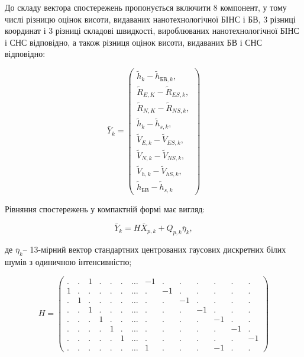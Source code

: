 До складу вектора спостережень  пропонується включити 8 компонент, у тому числі різницю 
оцінок висоти, видаваних  нанотехнологічної БІНС   і БВ, 3 різниці координат і 3 
різниці складові швидкості, вироблюваних нанотехнологічної БІНС і СНС відповідно, 
а також різниця оцінок висоти, видаваних БВ і СНС відповідно:

\begin{equation} 
\label{eq:measure_vector} 
\bar{Y}_{k} = 
\left(\begin{array}{l}
{\tilde{h}_{k} -\tilde{h}_{\text{БВ},k},}\\
{\tilde{R}_{E,K} -\tilde{R}_{ES,k},}\\
{\tilde{R}_{N,K} -\tilde{R}_{NS,k},}\\
{\tilde{h}_{k} -\tilde{h}_{s,k},}\\
{\tilde{V}_{E,k} -\tilde{V}_{ES,k},}\\
{\tilde{V}_{N,k} -\tilde{V}_{NS,k},}\\
{\tilde{V}_{h,k} -\tilde{V}_{hS,k},}\\
{\tilde{h}_{\text{БВ}} -\tilde{h}_{s,k}}
\end{array} \right)  
\end{equation} 

Рівняння спостережень у компактній  формі має вигляд:

\[\bar{Y}_{k} =H\bar{X}_{p,k} +Q_{p,k} \bar{\eta }_{k} ,\] 

де $\bar{\eta }_{k} $-- 13-мірний вектор стандартних центрованих гаусових дискретних 
білих шумів з одиничною інтенсивністю;

\[H=\left(\begin{array}{cccccccccccccc}    
{.} & {.} & {1} & {.} & {.} & {.} & {\ldots } & {-1} & {.} & {.} & {.} & {.} & {.} & {.} \\ 
{1} & {.} & {.} & {.} & {.} & {.} & {\ldots } & {.} & {-1} & {.} & {.} & {.} & {.} & {.} \\ 
{.} & {1} & {.} & {.} & {.} & {.} & {\ldots } & {.} & {.} & {-1} & {.} & {.} & {.} & {.} \\ 
{.} & {.} & {1} & {.} & {.} & {.} & {\ldots } & {.} & {.} & {.} & {-1} & {.} & {.} & {.} \\ 
{.} & {.} & {.} & {1} & {.} & {.} & {\ldots } & {.} & {.} & {.} & {.} & {-1} & {.} & {.} \\ 
{.} & {.} & {.} & {.} & {1} & {.} & {\ldots } & {.} & {.} & {.} & {.} & {.} & {-1} & {.} \\ 
{.} & {.} & {.} & {.} & {.} & {1} & {\ldots } & {.} & {.} & {.} & {.} & {.} & {.} & {-1} \\ 
{.} & {.} & {.} & {.} & {.} & {.} & {\ldots } & {1} & {.} & {.} & {.} & {-1} & {.} & {.} 
\end{array}\right)\] 

